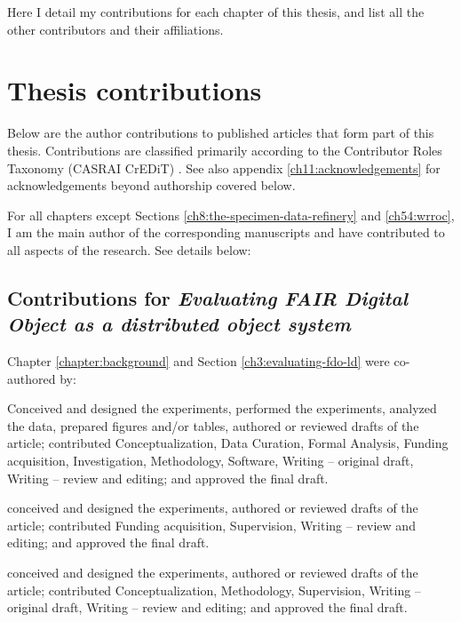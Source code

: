 \label{ch10:contributions} 

Here I detail my contributions for each chapter of this thesis, and
list all the other contributors and their affiliations.



\section{Thesis contributions}\label{ch10:my-contributions}

Below are the author contributions to published articles that form part
of this thesis. Contributions are classified primarily according to the
Contributor Roles Taxonomy (CASRAI CrEDiT) \cite{Brand 2015}. See 
also appendix \vref{ch11:acknowledgements} for acknowledgements beyond authorship covered below.

For all chapters except Sections \ref{ch8:the-specimen-data-refinery} and \ref{ch54:wrroc}, I am the main author of the corresponding manuscripts and have contributed to all aspects of the research. See details below:


\subsection{Contributions for \emph{Evaluating FAIR Digital
Object as a distributed object system}}\label{ch10:fdo}

Chapter \vref{chapter:background} and Section \vref{ch3:evaluating-fdo-ld} were co-authored by:

\begin{flushleft}\begin{description}
\tightlist
\item[Stian Soiland-Reyes]
Conceived and designed the experiments, performed the
experiments, analyzed the data, prepared ﬁgures and/or tables, authored or reviewed
drafts of the article; contributed 
Conceptualization, Data Curation, Formal Analysis, Funding acquisition, Investigation,
Methodology, Software, Writing -- original draft, Writing -- review and
editing;
and approved the ﬁnal draft.
\item[Carole Goble]
conceived and designed the experiments, authored or reviewed drafts of
the article; contributed
Funding acquisition, Supervision, Writing -- review and editing;
and approved the final draft.
\item[Paul Groth]
conceived and designed the experiments, authored or reviewed drafts of the
article; contributed
Conceptualization, Methodology, Supervision, Writing -- original draft, Writing -- review
and editing;
and approved the final draft.
\end{description}\end{flushleft}

